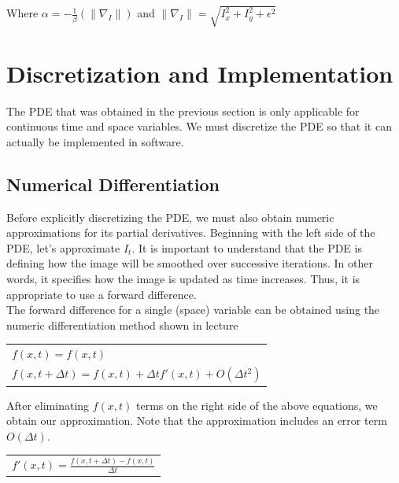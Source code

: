 \documentclass{article}
\begin{document}
    \noindent
    Where $\alpha = -\frac{1}{\beta}(\| \nabla_{I} \|)$ and $\| \nabla_{I} \| = \sqrt{I_{x}^2 + I_{y}^2 + \epsilon^2}$\\



  \newpage
  \section{Discretization and Implementation}
  \noindent
  The PDE that was obtained in the previous section is only applicable for continuous
  time and space variables. We must discretize the PDE so that it can actually be implemented in software.\\

  \subsection{Numerical Differentiation}
  \noindent
  Before explicitly discretizing the PDE, we must also obtain numeric approximations for its partial
  derivatives. Beginning with the left side of the PDE, let's approximate $I_{t}$. 
  It is important to understand that the PDE is defining how the image will be smoothed
  over successive iterations. In other words, it specifies how the image is updated as time increases.
  Thus, it is appropriate to use a forward difference.\\

  \noindent
  The forward difference for a single (space) variable can be obtained using the 
  numeric differentiation method shown in lecture
  \begin{center}
    \begin{tabular}{l}
      \vspace{12pt}
      $f(x,t) = f(x,t)$\\
      $f(x,t+\Delta t) = f(x,t) + \Delta t f'(x,t) + O(\Delta t^2)$\\
    \end{tabular}
  \end{center}

  \noindent
  After eliminating $f(x,t)$ terms on the right side of the above equations,
  we obtain our approximation. Note that the approximation includes an error term $O(\Delta t)$.
  \begin{center}
    \begin{tabular}{l}
      $f'(x,t) = \frac{f(x,t+\Delta t) - f(x,t)}{\Delta t}$\\
    \end{tabular}
  \end{center}
\end{document}
